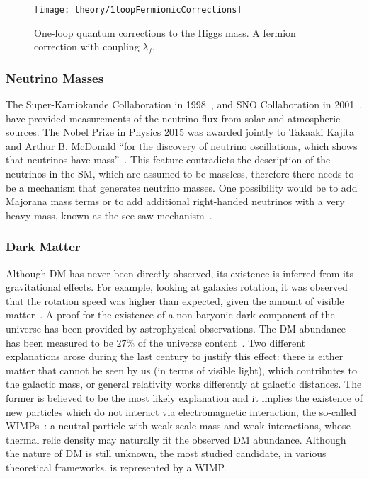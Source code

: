 			\begin{figure}
				\centering
				\texttt{[image: theory/1loopFermionicCorrections]}
				\caption{\label{fig:higgs_f_coupling} One-loop quantum corrections to the Higgs mass. A fermion correction with coupling $\lambda_f$.}
			\end{figure}



		\subsubsection*{Neutrino Masses}

			The Super-Kamiokande Collaboration in 1998~\cite{SK1998}, and SNO Collaboration in 2001~\cite{SNO2001}, have provided measurements of the neutrino flux from solar and atmospheric sources. 
			The Nobel Prize in Physics 2015 was awarded jointly to Takaaki Kajita and Arthur B. McDonald ``for the discovery of neutrino oscillations, which shows that neutrinos have mass''~\cite{Nobel2015}. This feature contradicts the description of the neutrinos in the \ac{SM}, which are assumed to be massless, therefore there needs to be a mechanism that generates neutrino masses. One possibility would be to add Majorana mass terms or to add additional right-handed neutrinos with a very heavy mass, known as the see-saw mechanism~\cite{Akhmedov1999}.


		\subsubsection*{Dark Matter}

			Although \ac{DM} has never been directly observed, its existence is inferred from its gravitational effects. For example, looking at galaxies rotation, it was observed that the rotation speed was higher than expected, given the amount of visible matter~\cite{Rubin1970}. A proof for the existence of a non-baryonic dark component of the universe has been provided by astrophysical observations. The \ac{DM} abundance has been measured to be $27\%$ of the universe content~\cite{Bradac:2008eu, 0067-0049-192-2-18, Ade:2013zuv}. Two different explanations arose during the last century to justify this effect: there is either matter that cannot be seen by us (in terms of visible light), which contributes to the galactic mass, or general relativity works differently at galactic distances. The former is believed to be the most likely explanation and it implies the existence of new particles which do not interact via electromagnetic interaction, the so-called \acp{WIMP}~\cite{oro44361}: a neutral particle with weak-scale mass and weak interactions, whose thermal relic density may naturally fit the observed \ac{DM} abundance. Although the nature of \ac{DM} is still unknown, the most studied candidate, in various theoretical frameworks, is represented by a \ac{WIMP}. 

